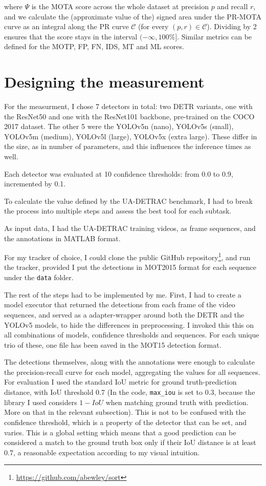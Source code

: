 where $\Psi$ is the MOTA score across the whole dataset at precision $p$ and recall $r$, and we calculate the (approximate value of the) signed area under the PR-MOTA curve as an integral along the PR curve $\mathcal{C}$ (for every $(p, r) \in \mathcal{C}$). Dividing by 2 ensures that the score stays in the interval $(-\infty, 100\%]$. Similar metrics can be defined for the MOTP, FP, FN, IDS, MT and ML scores.

\section{Designing the measurement}

For the measurment, I chose 7 detectors in total: two DETR variants, one with the ResNet50 and one with the ResNet101 backbone, pre-trained on the COCO 2017 dataset. The other 5 were the YOLOv5n (nano), YOLOv5s (small), YOLOv5m (medium), YOLOv5l (large), YOLOv5x (extra large). These differ in the size, as in number of parameters, and this influences the inference times as well.

Each detector was evaluated at 10 confidence thresholds: from 0.0 to 0.9, incremented by 0.1.

To calculate the value defined by the UA-DETRAC benchmark, I had to break the process into multiple steps and assess the best tool for each subtask.

As input data, I had the UA-DETRAC training videos, as frame sequences, and the annotations in MATLAB format.

For my tracker of choice, I could clone the public GitHub repository\footnote{\url{https://github.com/abewley/sort}}, and run the tracker, provided I put the detections in MOT2015 format for each sequence under the \verb|data| folder.

The rest of the steps had to be implemented by me. First, I had to create a model executor that returned the detections from each frame of the video sequences, and served as a adapter-wrapper around both the DETR and the YOLOv5 models, to hide the differences in preprocessing. I invoked this this on all combinations of models, confidence thresholds and sequences. For each unique trio of these, one file has been saved in the MOT15 detection format.

The detections themselves, along with the annotations were enough to calculate the precision-recall curve for each model, aggregating the values for all sequences. For evaluation I used the standard IoU metric for ground truth-prediction distance, with IoU threshold 0.7 (In the code, \verb|max_iou| is set to 0.3, because the library I used considers $1-IoU$ when matching ground truth with prediction. More on that in the relevant subsection). This is not to be confused with the confidence threshold, which is a property of the detector that can be set, and varies. This is a global setting which means that a good prediction can be considered a match to the ground truth box only if their IoU distance is at least 0.7, a reasonable expectation according to my visual intuition.

